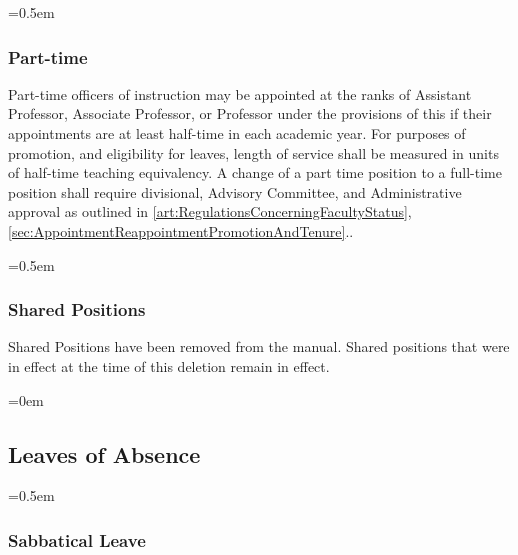 \documentclass{manual}
\let\oldsubsection\subsection
\renewcommand\subsection{\leftskip=0em\oldsubsection}
\let\oldsubsubsection\subsubsection
\renewcommand\subsubsection{\leftskip=0.5em\oldsubsubsection}
\begin{document}
\subsubsection{Part-time}
Part-time officers of instruction may be appointed at the ranks of Assistant Professor, Associate Professor, or Professor under the provisions of this  if their appointments are at least half-time in each academic year. For purposes of promotion, and eligibility for leaves, length of service shall be measured in units of half-time teaching equivalency. A change of a part time position to a full-time position shall require divisional, Advisory Committee, and Administrative approval as outlined in \cref{art:RegulationsConcerningFacultyStatus}, \cref{sec:AppointmentReappointmentPromotionAndTenure}..

\subsubsection{Shared Positions}
Shared Positions have been removed from the manual. Shared positions that were in effect at the time of this deletion remain in effect.

\subsection{Leaves of Absence}\label{sec:LeavesOfAbsence}

\subsubsection{Sabbatical Leave}
\end{document}
